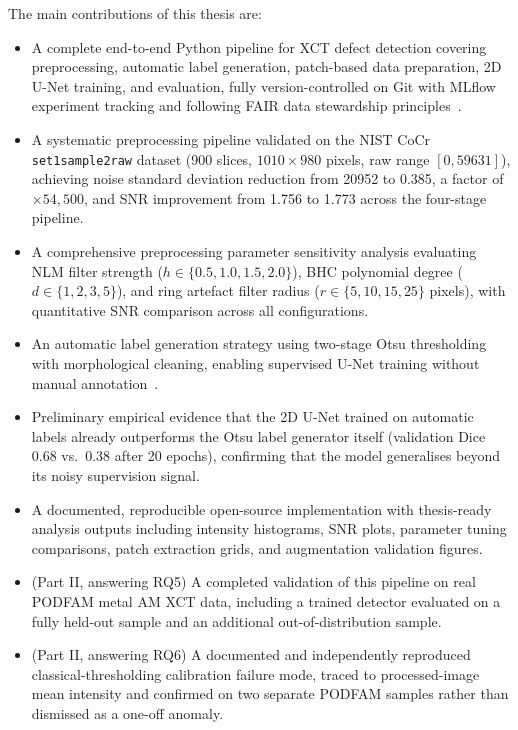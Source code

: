 The main contributions of this thesis are:
\begin{itemize}
\item A complete end-to-end Python pipeline for XCT defect detection covering preprocessing,
  automatic label generation, patch-based data preparation, 2D U-Net training, and evaluation, fully
  version-controlled on Git with MLflow experiment tracking and following FAIR data stewardship
  principles~\citep{Wilkinson2016}.
\item A systematic preprocessing pipeline validated on the NIST CoCr \texttt{set1sample2raw} dataset
  (900 slices, $1010 \times 980$ pixels, raw range $[0, 59631]$), achieving noise standard deviation
  reduction from 20952 to 0.385, a factor of $\times 54{,}500$, and SNR improvement from 1.756 to
  1.773 across the four-stage pipeline.
\item A comprehensive preprocessing parameter sensitivity analysis evaluating NLM filter strength
  ($h \in \{0.5, 1.0, 1.5, 2.0\}$), BHC polynomial degree ($d \in \{1, 2, 3, 5\}$), and ring artefact
  filter radius ($r \in \{5, 10, 15, 25\}$ pixels), with quantitative SNR comparison across all
  configurations.
\item An automatic label generation strategy using two-stage Otsu thresholding with morphological
  cleaning, enabling supervised U-Net training without manual
  annotation~\citep{Yosifov2020,Otsu1979}.
\item Preliminary empirical evidence that the 2D U-Net trained on automatic labels already
  outperforms the Otsu label generator itself (validation Dice 0.68 vs.\ 0.38 after 20 epochs),
  confirming that the model generalises beyond its noisy supervision signal.
\item A documented, reproducible open-source implementation with thesis-ready analysis outputs
  including intensity histograms, SNR plots, parameter tuning comparisons, patch extraction grids,
  and augmentation validation figures.
\item (Part II, answering RQ5) A completed validation of this pipeline on real PODFAM metal AM XCT
  data, including a trained detector evaluated on a fully held-out sample and an additional
  out-of-distribution sample.
\item (Part II, answering RQ6) A documented and independently reproduced classical-thresholding
  calibration failure mode, traced to processed-image mean intensity and confirmed on two separate
  PODFAM samples rather than dismissed as a one-off anomaly.
\end{itemize}
